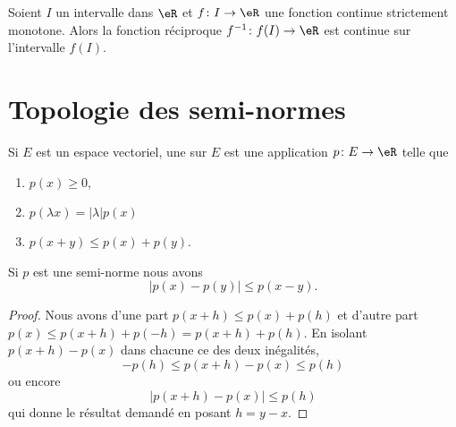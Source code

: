\begin{proposition}		\label{PropIntContMOnIvCont}
Soient $I$ un intervalle dans $\eR$ et $f\colon I\to \eR$ une fonction continue strictement monotone. Alors la fonction réciproque $f^{-1}\colon f(I)\to \eR$ est continue sur l'intervalle $f(I)$.
\end{proposition}

\section{Topologie des semi-normes}

\begin{definition}  \label{DefPNXlwmi}
    Si \( E\) est un espace vectoriel, une  sur \( E\) est une application \( p\colon E\to \eR\) telle que
    \begin{enumerate}
        \item
            \( p(x)\geq 0\),
        \item   \label{ItemSHnimhDii}
            \( p(\lambda x)=| \lambda |p(x)\)
        \item   \label{ItemSHnimhDiii}
            \( p(x+y)\leq p(x)+p(y)\).
    \end{enumerate}
\end{definition}

\begin{lemma}
    Si \( p\) est une semi-norme nous avons
    \begin{equation}
        | p(x)-p(y) |\leq p(x-y).
    \end{equation}
\end{lemma}

\begin{proof}
    Nous avons d'une part \( p(x+h)\leq p(x)+p(h)\) et d'autre part \( p(x)\leq p(x+h)+p(-h)=p(x+h)+p(h)\). En isolant \( p(x+h)-p(x)\) dans chacune ce des deux inégalités,
    \begin{equation}
        -p(h)\leq p(x+h)-p(x)\leq p(h)
    \end{equation}
    ou encore
    \begin{equation}
        |p(x+h)-p(x)|\leq p(h)
    \end{equation}
    qui donne le résultat demandé en posant \( h=y-x\).
\end{proof}

